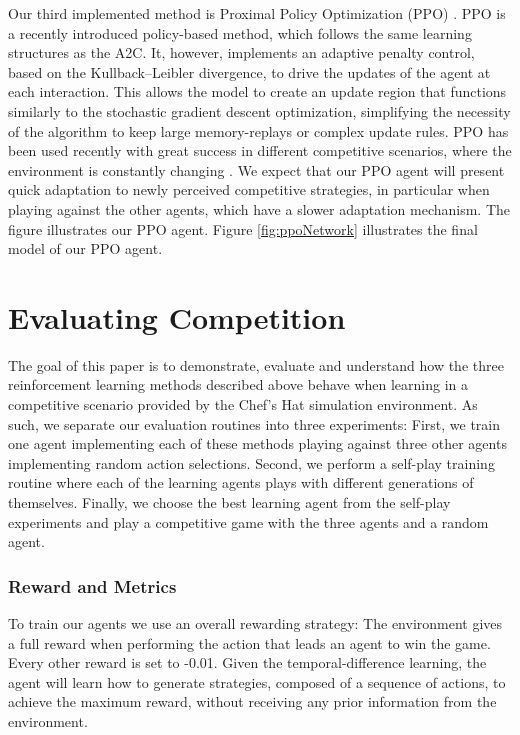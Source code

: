 \documentclass[a4paper,conference]{IEEEtran}
\begin{document}
Our third implemented method is Proximal Policy Optimization (PPO) \cite{schulman2017proximal}. PPO is a recently introduced policy-based method, which follows the same learning structures as the A2C. It, however, implements an adaptive penalty control, based on the Kullback–Leibler divergence, to drive the updates of the agent at each interaction. This allows the model to create an update region that functions similarly to the stochastic gradient descent optimization, simplifying the necessity of the algorithm to keep large memory-replays or complex update rules. PPO has been used recently with great success in different competitive scenarios, where the environment is constantly changing  \cite{bansal2017emergent, kidzinski2018learning}. We expect that our PPO agent will present quick adaptation to newly perceived competitive strategies, in particular when playing against the other agents, which have a slower adaptation mechanism. The figure illustrates our PPO agent. Figure \ref{fig:ppoNetwork} illustrates the final model of our PPO agent.

\section{Evaluating Competition}

The goal of this paper is to demonstrate, evaluate and understand how the three reinforcement learning methods described above behave when learning in a competitive scenario provided by the Chef's Hat simulation environment. As such, we separate our evaluation routines into three experiments: First, we train one agent implementing each of these methods playing against three other agents implementing random action selections. Second, we perform a self-play training routine where each of the learning agents plays with different generations of themselves. Finally, we choose the best learning agent from the self-play experiments and play a competitive game with the three agents and a random agent.

\subsubsection{Reward and Metrics}

To train our agents we use an overall rewarding strategy: The environment gives a full reward when performing the action that leads an agent to win the game. Every other reward is set to -0.01. Given the temporal-difference learning, the agent will learn how to generate strategies, composed of a sequence of actions, to achieve the maximum reward, without receiving any prior information from the environment. 
\end{document}
